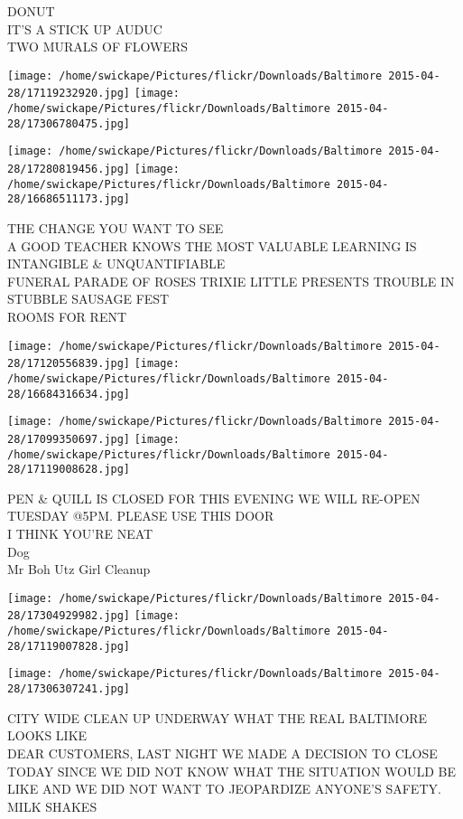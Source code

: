 \documentclass[10pt,letterpaper]{article}
\begin{document}
DONUT\\
IT'S A STICK UP AUDUC\\
TWO MURALS OF FLOWERS
\pagebreak

\texttt{[image: /home/swickape/Pictures/flickr/Downloads/Baltimore 2015-04-28/17119232920.jpg]}
\texttt{[image: /home/swickape/Pictures/flickr/Downloads/Baltimore 2015-04-28/17306780475.jpg]}

\texttt{[image: /home/swickape/Pictures/flickr/Downloads/Baltimore 2015-04-28/17280819456.jpg]}
\texttt{[image: /home/swickape/Pictures/flickr/Downloads/Baltimore 2015-04-28/16686511173.jpg]}

THE CHANGE YOU WANT TO SEE\\
A GOOD TEACHER KNOWS THE MOST VALUABLE LEARNING IS INTANGIBLE \& UNQUANTIFIABLE\\
FUNERAL PARADE OF ROSES TRIXIE LITTLE PRESENTS TROUBLE IN STUBBLE SAUSAGE FEST\\
ROOMS FOR RENT
\pagebreak

\texttt{[image: /home/swickape/Pictures/flickr/Downloads/Baltimore 2015-04-28/17120556839.jpg]}
\texttt{[image: /home/swickape/Pictures/flickr/Downloads/Baltimore 2015-04-28/16684316634.jpg]}

\texttt{[image: /home/swickape/Pictures/flickr/Downloads/Baltimore 2015-04-28/17099350697.jpg]}
\texttt{[image: /home/swickape/Pictures/flickr/Downloads/Baltimore 2015-04-28/17119008628.jpg]}

PEN \& QUILL IS CLOSED FOR THIS EVENING WE WILL RE{-}OPEN TUESDAY @5PM.  PLEASE USE THIS DOOR\\
I THINK YOU'RE NEAT\\
Dog\\
Mr Boh Utz Girl Cleanup
\pagebreak

\texttt{[image: /home/swickape/Pictures/flickr/Downloads/Baltimore 2015-04-28/17304929982.jpg]}
\texttt{[image: /home/swickape/Pictures/flickr/Downloads/Baltimore 2015-04-28/17119007828.jpg]}

\texttt{[image: /home/swickape/Pictures/flickr/Downloads/Baltimore 2015-04-28/17306307241.jpg]}

CITY WIDE CLEAN UP UNDERWAY WHAT THE REAL BALTIMORE LOOKS LIKE\\
DEAR CUSTOMERS, LAST NIGHT WE MADE A DECISION TO CLOSE TODAY SINCE WE DID NOT KNOW WHAT THE SITUATION WOULD BE LIKE AND WE DID NOT WANT TO JEOPARDIZE ANYONE'S SAFETY.\\
MILK SHAKES
\pagebreak
\end{document}
